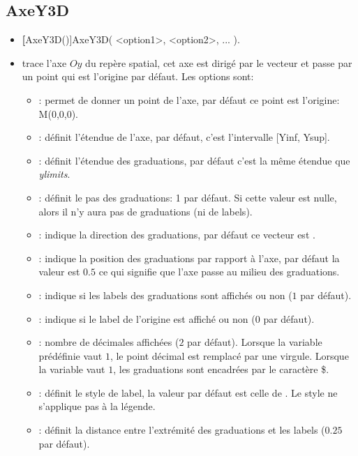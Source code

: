 \subsection{AxeY3D}
\begin{itemize}
 \item \util \textbf[AxeY3D()]{AxeY3D( <option1>, <option2>, ... )}.
 \item \desc trace l'axe $Oy$ du repère spatial, cet axe est dirigé par le vecteur  et passe par un point qui est l'origine par défaut. Les options sont:

  \begin{itemize}
  \item {}: permet de donner un point de l'axe, par défaut ce point est l'origine: M(0,0,0).
  \item {}: définit l'étendue de l'axe, par défaut, c'est l'intervalle [Yinf, Ysup].
  \item \opt{ygradlimits}{[y1,y2}: définit l'étendue des graduations, par défaut c'est la même étendue que \textit{ylimits}.
  \item {}: définit le pas des graduations: 1 par défaut. Si cette valeur est nulle, alors il n'y aura pas de graduations (ni de labels).
  \item {}: indique la direction des graduations, par défaut ce vecteur est .
  \item {}: indique la position des graduations par rapport à l'axe, par défaut la valeur est $0.5$ ce qui signifie que l'axe passe au milieu des graduations.
  \item {}: indique si les labels des graduations sont affichés ou non ($1$ par défaut).
  \item {}: indique si le label de l'origine est affiché ou non ($0$ par défaut).
  \item {}: nombre de décimales affichées ($2$ par défaut). Lorsque la variable prédéfinie  vaut $1$, le point décimal est remplacé par une virgule. Lorsque la variable  vaut $1$, les graduations sont encadrées par le caractère \$.
  \item {}: définit le style de label, la valeur par défaut est celle de . Le style ne s'applique pas à la légende.
  \item {}: définit la distance entre l'extrémité des graduations et les labels ($0.25$ par défaut).

\end{itemize}
\end{itemize}
